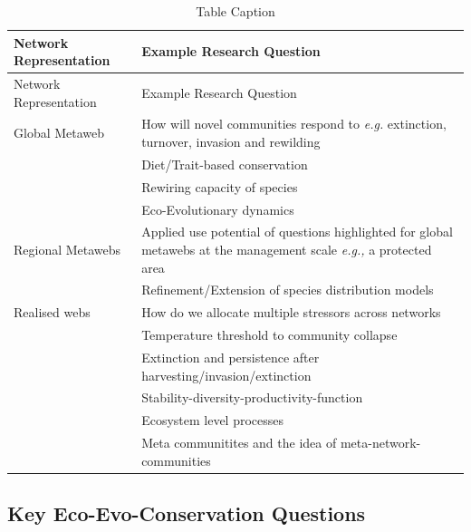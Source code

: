 \documentclass[
]{article}
\begin{document}
\begin{longtable}[]{@{}
  >{\raggedright\arraybackslash}p{}
  >{\raggedright\arraybackslash}p{}@{}}
\caption{Table Caption}\label{tbl-questions}\tabularnewline
\toprule\noalign{}
\begin{minipage}[b]{\linewidth}\raggedright
Network Representation
\end{minipage} & \begin{minipage}[b]{\linewidth}\raggedright
Example Research Question
\end{minipage} \\
\midrule\noalign{}
\endfirsthead
\toprule\noalign{}
\begin{minipage}[b]{\linewidth}\raggedright
Network Representation
\end{minipage} & \begin{minipage}[b]{\linewidth}\raggedright
Example Research Question
\end{minipage} \\
\midrule\noalign{}
\endhead
\bottomrule\noalign{}
\endlastfoot
Global Metaweb & How will novel communities respond to \emph{e.g.}
extinction, turnover, invasion and rewilding \\
& Diet/Trait-based conservation \\
& Rewiring capacity of species \\
& Eco-Evolutionary dynamics \\
Regional Metawebs & Applied use potential of questions highlighted for
global metawebs at the management scale \emph{e.g.,} a protected area \\
& Refinement/Extension of species distribution models \\
Realised webs & How do we allocate multiple stressors across networks \\
& Temperature threshold to community collapse \\
& Extinction and persistence after harvesting/invasion/extinction \\
& Stability-diversity-productivity-function \\
& Ecosystem level processes \\
& Meta communitites and the idea of meta-network-communities \\
\end{longtable}

\subsection{Key Eco-Evo-Conservation
Questions}\label{key-eco-evo-conservation-questions}
\end{document}

